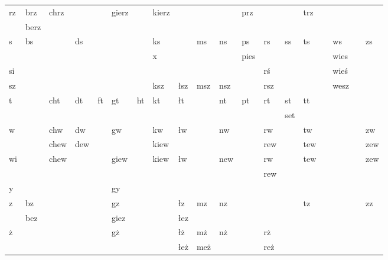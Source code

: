 \documentclass{article}
\begin{document}
\begin{longtable}{p{2mm}|p{2mm}p{4mm}p{2mm}p{1mm}p{3mm}p{2mm}p{3mm}p{2mm}p{4mm}p{3mm}p{3mm}p{2mm}p{2mm}p{2mm}p{1mm}p{1mm}p{1mm}p{4mm}}
\hline
rz & brz & chrz &  &  & gierz &  & kierz &  &  &  & prz &  &  & trz &  &  &  & \\
 & berz &  &  &  &  &  &  &  &  &  &  &  &  &  &  &  &  & \\
\hline
s & bs &  & ds &  &  &  & ks &  & ms & ns & ps & rs & ss & ts &  & ws &  & zs\\
 &  &  &  &  &  &  & x &  &  &  & pies &  &  &  &  & wies &  & \\
\hline
si &  &  &  &  &  &  &  &  &  &  &  & rś &  &  &  & wieś &  & \\
\hline
sz &  &  &  &  &  &  & ksz & łsz & msz & nsz &  & rsz &  &  &  & wesz &  & \\
\hline
t &  & cht & dt & ft & gt & ht & kt & łt &  & nt & pt & rt & st & tt &  &  &  & \\
 &  &  &  &  &  &  &  &  &  &  &  &  & set &  &  &  &  & \\
\hline
w &  & chw & dw &  & gw &  & kw & łw &  & nw &  & rw &  & tw &  &  &  & zw\\
 &  & chew & dew &  &  &  & kiew &  &  &  &  & rew &  & tew &  &  &  & zew\\
\hline
wi &  & chew &  &  & giew &  & kiew & łw &  & new &  & rw &  & tew &  &  &  & zew\\
 &  &  &  &  &  &  &  &  &  &  &  & rew &  &  &  &  &  & \\
\hline
y &  &  &  &  & gy &  &  &  &  &  &  &  &  &  &  &  &  & \\
\hline
z & bz &  &  &  & gz &  &  & łz & mz & nz &  &  &  & tz &  &  &  & zz\\
 & bez &  &  &  & giez &  &  & łez &  &  &  &  &  &  &  &  &  & \\
\hline
ż &  &  &  &  & gż &  &  & łż & mż & nż &  & rż &  &  &  &  &  & \\
 &  &  &  &  &  &  &  & łeż & meż &  &  & reż &  &  &  &  &  & \\
\hline
\end{longtable}

\end{document}
